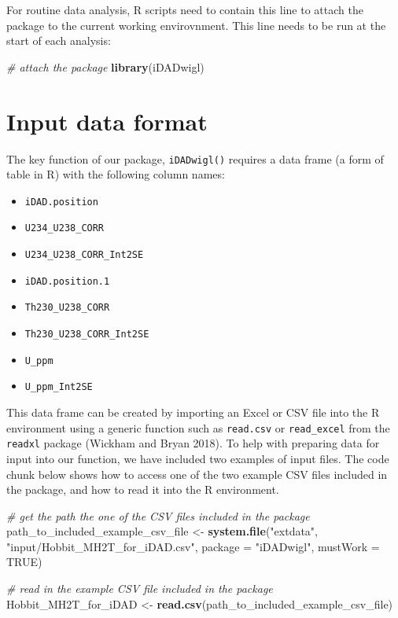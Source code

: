 \documentclass[]{elsarticle} %
\providecommand{\tightlist}{%
  \setlength{\itemsep}{0pt}\setlength{\parskip}{0pt}}
\newenvironment{Shaded}{\begin{snugshade}}{\end{snugshade}}
\newcommand{\CommentTok}[1]{\textcolor[rgb]{0.56,0.35,0.01}{\textit{#1}}}
\newcommand{\DataTypeTok}[1]{\textcolor[rgb]{0.13,0.29,0.53}{#1}}
\newcommand{\KeywordTok}[1]{\textcolor[rgb]{0.13,0.29,0.53}{\textbf{#1}}}
\newcommand{\NormalTok}[1]{#1}
\newcommand{\OtherTok}[1]{\textcolor[rgb]{0.56,0.35,0.01}{#1}}
\newcommand{\StringTok}[1]{\textcolor[rgb]{0.31,0.60,0.02}{#1}}
\begin{document}
For routine data analysis, R scripts need to contain this line to attach the package to the current working envirovnment. This line needs to be run at the start of each analysis:

\begin{Shaded}
\begin{Highlighting}[]
\CommentTok{# attach the package}
\KeywordTok{library}\NormalTok{(iDADwigl)}
\end{Highlighting}
\end{Shaded}

\newpage

\hypertarget{input-data-format}{%
\section{Input data format}\label{input-data-format}}

The key function of our package, \texttt{iDADwigl()} requires a data frame (a form of table in R) with the following column names:

\begin{itemize}
\tightlist
\item
  \texttt{iDAD.position}
\item
  \texttt{U234\_U238\_CORR}
\item
  \texttt{U234\_U238\_CORR\_Int2SE}
\item
  \texttt{iDAD.position.1}
\item
  \texttt{Th230\_U238\_CORR}
\item
  \texttt{Th230\_U238\_CORR\_Int2SE}
\item
  \texttt{U\_ppm}
\item
  \texttt{U\_ppm\_Int2SE}
\end{itemize}

This data frame can be created by importing an Excel or CSV file into the R environment using a generic function such as \texttt{read.csv} or \texttt{read\_excel} from the \texttt{readxl} package (Wickham and Bryan 2018). To help with preparing data for input into our function, we have included two examples of input files. The code chunk below shows how to access one of the two example CSV files included in the package, and how to read it into the R environment.

\begin{Shaded}
\begin{Highlighting}[]
\CommentTok{# get the path the one of the CSV files included in the package}
\NormalTok{path_to_included_example_csv_file <-}
\StringTok{  }\KeywordTok{system.file}\NormalTok{(}\StringTok{"extdata"}\NormalTok{,}
            \StringTok{"input/Hobbit_MH2T_for_iDAD.csv"}\NormalTok{,}
            \DataTypeTok{package =} \StringTok{"iDADwigl"}\NormalTok{,}
            \DataTypeTok{mustWork =} \OtherTok{TRUE}\NormalTok{)}

\CommentTok{# read in the example CSV file included in the package}
\NormalTok{Hobbit_MH2T_for_iDAD <-}
\StringTok{  }\KeywordTok{read.csv}\NormalTok{(path_to_included_example_csv_file)}
\end{Highlighting}
\end{Shaded}
\end{document}
